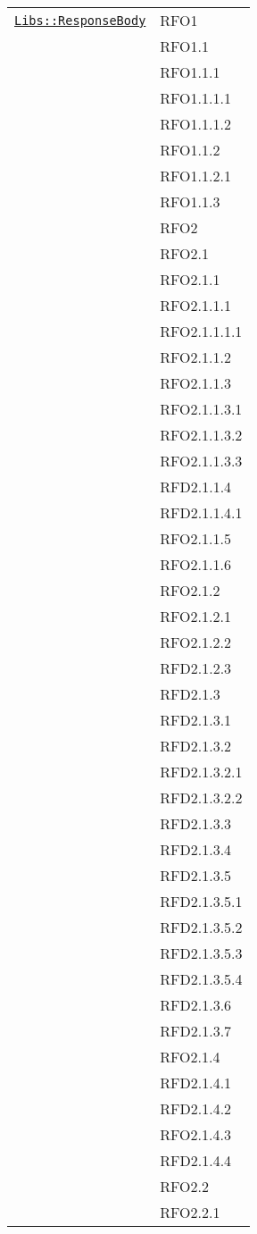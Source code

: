 \begin{longtable}{|>{\centering}m{10cm}|m{3cm}<{\centering}|}
\hyperref[Libs::ResponseBody]{\texttt{Libs::ResponseBody}} & RFO1\\
& RFO1.1\\
& RFO1.1.1\\
& RFO1.1.1.1\\
& RFO1.1.1.2\\
& RFO1.1.2\\
& RFO1.1.2.1\\
& RFO1.1.3\\
& RFO2\\
& RFO2.1\\
& RFO2.1.1\\
& RFO2.1.1.1\\
& RFO2.1.1.1.1\\
& RFO2.1.1.2\\
& RFO2.1.1.3\\
& RFO2.1.1.3.1\\
& RFO2.1.1.3.2\\
& RFO2.1.1.3.3\\
& RFD2.1.1.4\\
& RFD2.1.1.4.1\\
& RFO2.1.1.5\\
& RFO2.1.1.6\\
& RFO2.1.2\\
& RFO2.1.2.1\\
& RFO2.1.2.2\\
& RFD2.1.2.3\\
& RFD2.1.3\\
& RFD2.1.3.1\\
& RFD2.1.3.2\\
& RFD2.1.3.2.1\\
& RFD2.1.3.2.2\\
& RFD2.1.3.3\\
& RFD2.1.3.4\\
& RFD2.1.3.5\\
& RFD2.1.3.5.1\\
& RFD2.1.3.5.2\\
& RFD2.1.3.5.3\\
& RFD2.1.3.5.4\\
& RFD2.1.3.6\\
& RFD2.1.3.7\\
& RFO2.1.4\\
& RFD2.1.4.1\\
& RFD2.1.4.2\\
& RFO2.1.4.3\\
& RFD2.1.4.4\\
& RFO2.2\\
& RFO2.2.1\\

\end{longtable}
